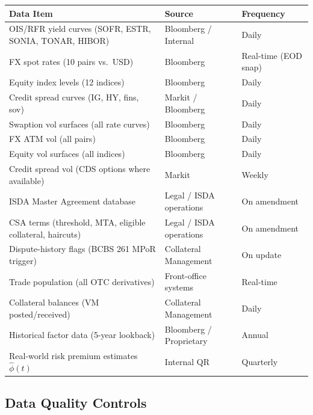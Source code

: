 \documentclass[11pt,a4paper]{article}
\begin{document}
\begin{longtable}{@{}lll@{}}
\toprule
\textbf{Data Item} & \textbf{Source} & \textbf{Frequency} \\
\midrule
\endhead
\bottomrule
\endfoot
OIS/RFR yield curves (SOFR, ESTR, SONIA, TONAR, HIBOR) & Bloomberg / Internal & Daily \\
FX spot rates (10 pairs vs.\ USD) & Bloomberg & Real-time (EOD snap) \\
Equity index levels (12 indices) & Bloomberg & Daily \\
Credit spread curves (IG, HY, fins, sov) & Markit / Bloomberg & Daily \\
Swaption vol surfaces (all rate curves) & Bloomberg & Daily \\
FX ATM vol (all pairs) & Bloomberg & Daily \\
Equity vol surfaces (all indices) & Bloomberg & Daily \\
Credit spread vol (CDS options where available) & Markit & Weekly \\
ISDA Master Agreement database & Legal / ISDA operations & On amendment \\
CSA terms (threshold, MTA, eligible collateral, haircuts) & Legal / ISDA operations & On amendment \\
Dispute-history flags (BCBS 261 MPoR trigger) & Collateral Management & On update \\
Trade population (all OTC derivatives) & Front-office systems & Real-time \\
Collateral balances (VM posted/received) & Collateral Management & Daily \\
Historical factor data (5-year lookback) & Bloomberg / Proprietary & Annual \\
Real-world risk premium estimates $\hat{\phi}(t)$ & Internal QR & Quarterly \\
\end{longtable}

\subsection{Data Quality Controls}
\end{document}
